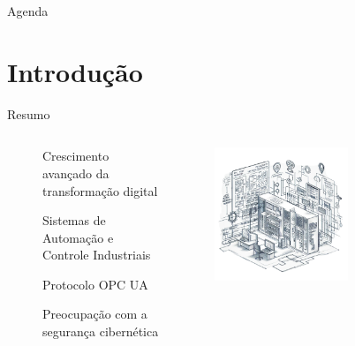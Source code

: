 \documentclass{uspBeamer}
\begin{document}
	\begin{frame}{Agenda}
		\tableofcontents
	\end{frame}

    \section{Introdução}

    \begin{frame}{Resumo}
        \begin{figure}
            \begin{columns}
                \begin{column}{.5\textwidth}
                    \begin{wideitemize}
                        \item Crescimento avançado da transformação digital
                        \item Sistemas de Automação e Controle Industriais
                        \item Protocolo OPC UA
                        \item Preocupação com a segurança cibernética
                    \end{wideitemize}
                \end{column}
                \begin{column}{.5\textwidth}
                    \begin{figure}
                        \includegraphics[width=0.8\textwidth]{master.png}
                    \end{figure}
                \end{column}
            \end{columns}
        \end{figure}
    \end{frame}
\end{document}
